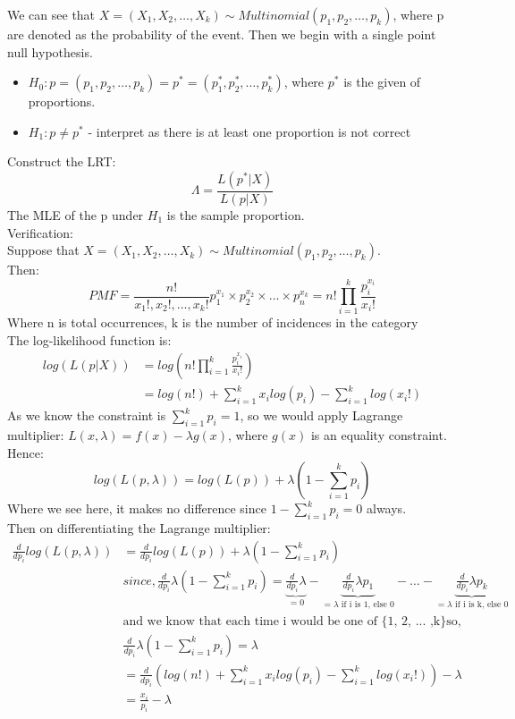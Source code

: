 \documentclass[12pt ]{article}
\begin{document}
We can see that $X = (X_{1}, X_{2}, \ldots, X_{k}) \sim Multinomial(p_{1}, p_{2}, \ldots, p_{k})$, where p are denoted as the probability of the event. Then we begin with a single point null hypothesis.
\begin{itemize}
\item $H_{0}: p = (p_{1}, p_{2}, \ldots, p_{k}) = p^{*} = (p_{1}^{*}, p_{2}^{*}, \ldots, p_{k}^{*})$, where $p^{*}$ is the given of proportions.
\item $H_{1}: p \neq p^{*}$ - interpret as there is at least one proportion is not correct
\end{itemize}
Construct the LRT:
\begin{equation*}
\Lambda = \frac{L(p^{*} | X)}{L(p|X)}
\end{equation*}
The MLE of the p under $H_{1}$ is the sample proportion.\\
\color{blue}
Verification:\\
Suppose that $X = (X_{1}, X_{2}, \ldots, X_{k}) \sim Multinomial(p_{1}, p_{2}, \ldots, p_{k})$. \\
Then:
\begin{equation*}
PMF = \frac{n!}{x_{1}!, x_{2}!, \ldots, x_{k}!} p_{1}^{x_{1}} \times p_{2}^{x_{2}} \times \dots \times p_{n}^{x_{k}} = n! \prod_{i=1}^{k} \frac{p_{i}^{x_{i}}}{x_{i}!}
\end{equation*}
Where n is total occurrences, k is the number of incidences in the category \\
The log-likelihood function is:
\begin{align*}
log(L(p|X)) &= log(n! \prod_{i=1}^{k} \frac{p_{i}^{x_{i}}}{x_{i}!}) \\
&= log(n!) + \sum_{i=1}^{k}x_{i}log(p_{i}) - \sum_{i=1}^{k}log(x_{i}!) 
\end{align*}
As we know the constraint is $\sum_{i=1}^{k} p_{i} = 1$, so we would apply Lagrange multiplier: $L(x, \lambda) = f(x) - \lambda g(x)$, where $g(x)$ is an equality constraint.\\
Hence:
\begin{equation*}
log(L(p, \lambda)) = log(L(p)) + \lambda(1-\sum_{i=1}^{k} p_{i})
\end{equation*}
Where we see here, it makes no difference since $1-\sum_{i=1}^{k} p_{i} = 0$ always. \\
Then on differentiating the Lagrange multiplier:
\begin{align*}
\frac{d}{dp_{i}} log(L(p, \lambda)) &= \frac{d}{dp_{i}} log(L(p)) + \lambda(1-\sum_{i=1}^{k} p_{i}) \\
& since, \frac{d}{dp_{i}} \lambda(1-\sum_{i=1}^{k} p_{i}) = \underbrace{\frac{d}{dp_{i}} \lambda}_{=0} - \underbrace{\frac{d}{dp_{i}} \lambda p_{1}}_{=\lambda \text{ if i is 1, else 0}} - \ldots - \underbrace{\frac{d}{dp_{i}} \lambda p_{k}}_{=\lambda \text{ if i is k, else 0}} \\
& \text{and we know that each time i would be one of \{1, 2, ... ,k\} so, }\\
& \frac{d}{dp_{i}} \lambda(1-\sum_{i=1}^{k} p_{i}) = \lambda \\
&=  \frac{d}{dp_{i}} (log(n!) + \sum_{i=1}^{k}x_{i}log(p_{i}) - \sum_{i=1}^{k}log(x_{i}!)) - \lambda \\
&= \frac{x_{i}}{p_{i}} - \lambda
\end{align*}
\end{document}

